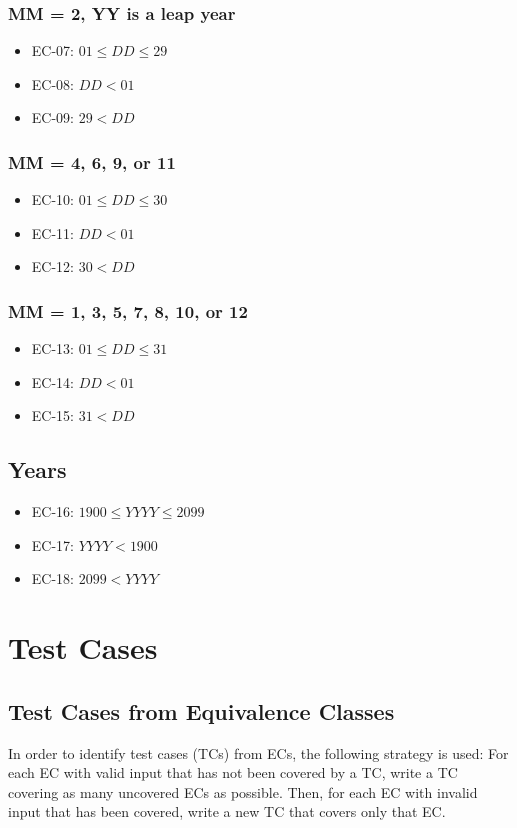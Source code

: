 \documentclass[11pt, oneside]{article}   	%
\begin{document}
\subsubsection{MM = 2, YY is a leap year}
	\begin{itemize}
		\item{EC-07: $01 \leq DD \leq 29$}
		\item{EC-08: $DD < 01$}
		\item{EC-09: $29 < DD$}
	\end{itemize}	
	
\subsubsection{MM = 4, 6, 9, or 11}
	\begin{itemize}
		\item{EC-10: $01 \leq DD \leq 30$}
		\item{EC-11: $DD < 01$}
		\item{EC-12: $30 < DD$}
	\end{itemize}
	
\subsubsection{MM = 1, 3, 5, 7, 8, 10, or 12}
	\begin{itemize}
		\item{EC-13: $01 \leq DD \leq 31$}
		\item{EC-14: $DD < 01$}
		\item{EC-15: $31 < DD$}
	\end{itemize}

\subsection{Years}
	\begin{itemize}
		\item{EC-16: $1900 \leq YYYY \leq 2099$}
		\item{EC-17: $YYYY < 1900$}
		\item{EC-18: $2099 < YYYY$}
	\end{itemize}

\newpage
\section{Test Cases}
\subsection{Test Cases from Equivalence Classes}
In order to identify test cases (TCs) from ECs, the following strategy is used: For each EC with valid input that has not been covered by a TC, write a TC covering as many uncovered ECs as possible. Then, for each EC with invalid input that has been covered, write a new TC that covers only that EC.
\end{document}
